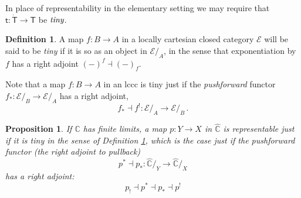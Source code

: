 \documentclass[12pt,reqno]{amsart}
\newcommand{\C}{\ensuremath{\mathbb{C}}}
\newcommand{\EE}{\ensuremath{\mathcal{E}}}
\renewcommand{\to}{\ensuremath{\rightarrow}}
\newcommand{\too}{\ensuremath{\longrightarrow}}
\renewcommand{\t}{\ensuremath{\mathsf{t}}}
\newcommand{\tT}{\ensuremath{{\t}:\TT\to\T}}
\newcommand{\T}{\ensuremath{\mathsf{T}}}
\newcommand{\TT}{\ensuremath{\dot{\mathsf{T}}}}
\newtheorem{proposition}[theorem]{Proposition}
\theoremstyle{remark}
\theoremstyle{definition}
\newtheorem{definition}[theorem]{Definition}
\begin{document}
In place of representability in the elementary setting we may require that $\tT$ be $\emph{tiny}$.

\begin{definition}\label{def:tinymap}
 A map $f : B \to A$ in a locally cartesian closed category $\EE$ will be said to be \emph{tiny} if it is so as an object in $\EE/_A$, in the sense that exponentiation by $f$ has a right adjoint $(-)^f \dashv (-)_f$. 
\end{definition}

Note that a map $f : B \to A$ in an lccc is tiny just if the \emph{pushforward} functor $f_* : \EE/_B \to \EE/_A$ has a right adjoint,
\[
f_* \dashv f^! : \EE/_A \too \EE/_B\,.
\]

\begin{proposition}\label{prop:rep_is_tiny}
If $\C$ has finite limits, a map $p : Y \to X$ in $\widehat{\C}$ is representable just if it is tiny in the sense of Definition \ref{def:tinymap}, which is the case just if the \emph{pushforward functor} (the right adjoint to pullback) 
\[
p^* \dashv p_* : \widehat{\C}/_{Y} \longrightarrow \widehat{\C}/_{X}
\] 
has a \emph{right} adjoint:
\[
p_! \dashv p^*\dashv p_* \dashv  p^!
\]
\end{proposition}
\end{document}
